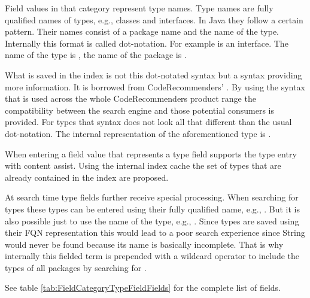 Field values in that category represent type names. 
Type names are fully qualified names of types, e.g., classes and interfaces. 
In Java they follow a certain pattern. Their names consist of a package name and the name of the type. 
Internally this format is called dot-notation. For example  is an interface. 
The name of the type is , the name of the package is .

What is saved in the index is not this dot-notated syntax but a syntax providing more information. It is borrowed from CodeRecommenders' . 
By using the syntax that is used across the whole CodeRecommenders product range the compatibility between the search engine and those potential consumers is provided. 
For types that syntax does not look all that different than the usual dot-notation. The internal representation of the aforementioned type  is .

When entering a field value that represents a type field \cname{} supports the type entry with content assist. 
Using the internal index cache the set of types that are already contained in the index are proposed.

At search time type fields further receive special processing. When searching for types these types can be entered using their fully qualified name, e.g., .
But it is also possible just to use the name of the type, e.g., . 
Since types are saved using their FQN representation this would lead to a poor search experience since String would never be found because its name is basically incomplete. 
That is why internally this fielded term is prepended with a wildcard operator to include the types  of all packages by searching for .

See table \ref{tab:FieldCategoryTypeFieldFields} for the complete list of fields.


